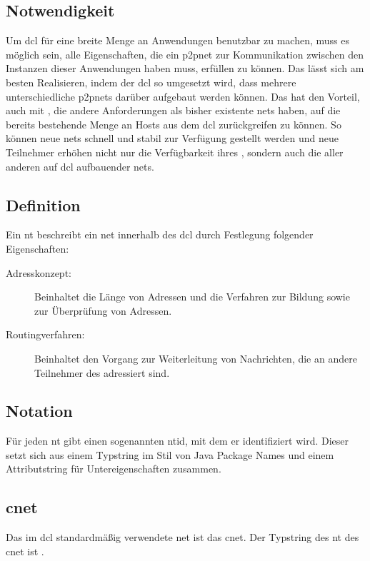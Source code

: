 
\subsection{Notwendigkeit}
Um \gls{dcl} für eine breite Menge an Anwendungen benutzbar zu machen, muss es möglich sein, alle
Eigenschaften, die ein \gls{p2pnet} zur Kommunikation zwischen den Instanzen dieser Anwendungen
haben muss, erfüllen zu können. Das lässt sich am besten Realisieren, indem der \gls{dcl} so umgesetzt
wird, dass mehrere unterschiedliche \glspl{p2pnet} darüber aufgebaut werden können.
Das hat den Vorteil, auch mit , die andere Anforderungen
als bisher existente \glspl{net} haben, auf die bereits bestehende Menge an Hosts aus dem \gls{dcl}
zurückgreifen zu können. So können neue \glspl{net} schnell und stabil zur Verfügung gestellt werden
und neue Teilnehmer erhöhen nicht nur die Verfügbarkeit ihres , sondern auch
die aller anderen auf \gls{dcl} aufbauender \glspl{net}.

\subsection{Definition}
Ein \gls{nt} beschreibt ein \gls{net} innerhalb des \gls{dcl} durch Festlegung folgender Eigenschaften:

\begin{description}
	
	\item [{Adresskonzept:}]
		Beinhaltet die Länge von Adressen und die Verfahren zur Bildung sowie zur Überprüfung
		von Adressen.
	
	\item [{Routingverfahren:}]
		Beinhaltet den Vorgang zur Weiterleitung von Nachrichten, die an andere Teilnehmer des
		 adressiert sind.
	
\end{description}

\subsection{Notation}
Für jeden \gls{nt} gibt einen sogenannten \gls{ntid}, mit dem er identifiziert wird. Dieser setzt sich aus
einem Typstring im Stil von Java Package Names und einem Attributstring für Untereigenschaften zusammen.

\subsection{\gls*{cnet}}
Das im \gls{dcl} standardmäßig verwendete \gls{net} ist das \gls{cnet}. Der Typstring des \gls{nt} des
\gls{cnet} ist \code{\cnettype}.

